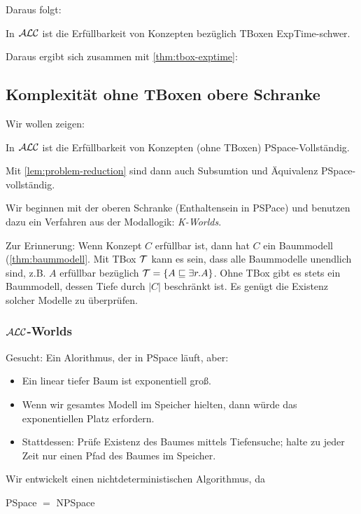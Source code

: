Daraus folgt:
\begin{theorem}
In $\mathcal{A}\mathcal{L}\mathcal{C}$ ist die Erfüllbarkeit von Konzepten bezüglich TBoxen ExpTime-schwer.
\end{theorem}

Daraus ergibt sich zusammen mit \autoref{thm:tbox-exptime}:

\subsection{Komplexität ohne TBoxen obere
Schranke}\label{komplexituxe4t-ohne-tboxen-obere-schranke}

Wir wollen zeigen:

\begin{theorem}
In $\mathcal{A}\mathcal{L}\mathcal{C}$ ist die Erfüllbarkeit von Konzepten (ohne TBoxen)
PSpace-Vollständig.
\end{theorem}
Mit \autoref{lem:problem-reduction} sind dann auch Subsumtion und Äquivalenz PSpace-vollständig.

Wir beginnen mit der oberen Schranke (Enthaltensein in PSPace) und benutzen dazu ein Verfahren aus der Modallogik: \emph{K-Worlds}.

Zur Erinnerung: Wenn Konzept $C$ erfüllbar ist, dann hat $C$ ein Baummodell (\autoref{thm:baummodell}. Mit TBox $\mathcal{T}$ kann es sein, dass alle Baummodelle unendlich sind, z.B. $A$ erfüllbar bezüglich $\mathcal{T} = \{A \sqsubseteq \exists r.A\}$. Ohne TBox gibt es stets ein Baummodell, dessen Tiefe durch $|C|$ beschränkt ist. Es genügt die Existenz solcher Modelle zu überprüfen.

\subsubsection{\texorpdfstring{$\mathcal{A}\mathcal{L}\mathcal{C}$}{ALC}-Worlds}\label{alc-worlds}

Gesucht: Ein Alorithmus, der in PSpace läuft, aber:
\begin{itemize}
\item Ein linear tiefer Baum ist exponentiell groß.
\item Wenn wir gesamtes Modell im Speicher hielten, dann würde das exponentiellen Platz erfordern.
\item Stattdessen: Prüfe Existenz des Baumes mittels Tiefensuche; halte zu
  jeder Zeit nur einen Pfad des Baumes im Speicher.
\end{itemize}

Wir entwickelt einen nichtdeterministischen Algorithmus, da
\begin{theorem}[Savitch 1970]
PSpace $=$ NPSpace
\end{theorem}

